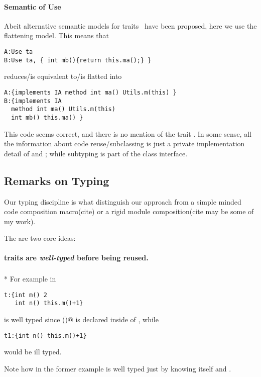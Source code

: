 \paragraph*{Semantic of Use}
Abeit alternative semantic models for traits~\cite{} have been proposed,
here we use the flattening model.
This means that 
\begin{lstlisting}
A:Use ta
B:Use ta, { int mb(){return this.ma();} }
\end{lstlisting}
 
  reduces/is equivalent to/is flatted into
  
 \begin{lstlisting}
A:{implements IA method int ma() Utils.m(this) }
B:{implements IA
  method int ma() Utils.m(this)
  int mb() this.ma() } 

 \end{lstlisting}
 
This code seems correct, and there is no mention of the trait \Q@ta@. In some sense, all the information about code reuse/subclassing is just a private implementation detail of \Q@A@ and \Q@B@; while subtyping is part of the class interface.

\subsection{Remarks on Typing}
Our typing discipline is 
what distinguish our approach from a simple minded code composition macro(cite)
or a rigid module composition(cite may be some of my work).

The are two core ideas:
\paragraph*{traits are \emph{well-typed} before being reused.}${}_{}$\\*
 For example in

\begin{lstlisting}
t:{int m() 2 
   int n() this.m()+1}
\end{lstlisting}

\noindent \Q@t@ is well typed since \Q@m()@ is declared inside of \Q@t@, while

\begin{lstlisting}
t1:{int n() this.m()+1} 
\end{lstlisting}
\noindent would be ill typed.

\noindent Note how in the former example \Q@ta@ is well typed just by knowing itself and \Q@IA@.

